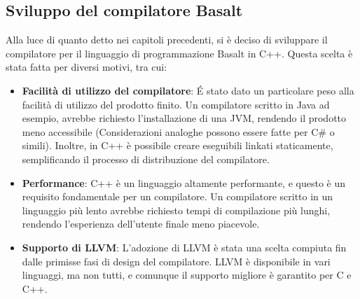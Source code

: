 \subsection{Sviluppo del compilatore Basalt}
Alla luce di quanto detto nei capitoli precedenti, si è deciso di sviluppare il compilatore 
per il linguaggio di programmazione Basalt in C++. Questa scelta è stata fatta per diversi motivi, 
tra cui:

\begin{itemize}
    \item \textbf{Facilità di utilizzo del compilatore}: É stato dato un particolare peso alla facilità di utilizzo 
    del prodotto finito. Un compilatore scritto in Java ad esempio, avrebbe richiesto l'installazione di una JVM, 
    rendendo il prodotto meno accessibile (Considerazioni analoghe possono essere fatte per C\# o simili). 
    Inoltre, in C++ è possibile creare eseguibili linkati staticamente, semplificando il processo di 
    distribuzione del compilatore.
    
    \item \textbf{Performance}: C++ è un linguaggio altamente performante, e questo è un requisito
    fondamentale per un compilatore. Un compilatore scritto in un linguaggio più lento avrebbe richiesto
    tempi di compilazione più lunghi, rendendo l'esperienza dell'utente finale meno piacevole.

    \item \textbf{Supporto di LLVM}: L'adozione di LLVM è stata una scelta compiuta fin dalle primisse fasi di 
    design del compilatore. LLVM è disponibile in vari linguaggi, ma non tutti, e comunque il supporto migliore
    è garantito per C e C++.
\end{itemize}


